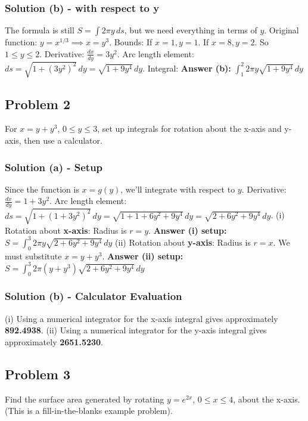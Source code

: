 \documentclass{article}
\begin{document}
\subsubsection*{Solution (b) - with respect to y}
The formula is still $ S = \int 2\pi y \,ds $, but we need everything in terms of $y$.
Original function: $y = x^{1/3} \implies x = y^3$.
Bounds: If $x=1, y=1$. If $x=8, y=2$. So $1 \le y \le 2$.
Derivative: $ \frac{dx}{dy} = 3y^2 $.
Arc length element: $ ds = \sqrt{1 + (3y^2)^2} \,dy = \sqrt{1 + 9y^4} \,dy $.
Integral:
\textbf{Answer (b):} $ \int_{1}^{2} 2\pi y \sqrt{1 + 9y^4} \,dy $

\subsection{Problem 2}
For $x = y + y^3$, $0 \le y \le 3$, set up integrals for rotation about the x-axis and y-axis, then use a calculator.
\subsubsection*{Solution (a) - Setup}
Since the function is $x=g(y)$, we'll integrate with respect to $y$.
Derivative: $ \frac{dx}{dy} = 1 + 3y^2 $.
Arc length element: $ ds = \sqrt{1 + (1 + 3y^2)^2} \,dy = \sqrt{1 + 1 + 6y^2 + 9y^4} \,dy = \sqrt{2 + 6y^2 + 9y^4} \,dy $.
(i) Rotation about \textbf{x-axis}: Radius is $r=y$.
\textbf{Answer (i) setup:} $ S = \int_{0}^{3} 2\pi y \sqrt{2 + 6y^2 + 9y^4} \,dy $
(ii) Rotation about \textbf{y-axis}: Radius is $r=x$. We must substitute $x = y+y^3$.
\textbf{Answer (ii) setup:} $ S = \int_{0}^{3} 2\pi (y+y^3) \sqrt{2 + 6y^2 + 9y^4} \,dy $

\subsubsection*{Solution (b) - Calculator Evaluation}
(i) Using a numerical integrator for the x-axis integral gives approximately \textbf{892.4938}.
(ii) Using a numerical integrator for the y-axis integral gives approximately \textbf{2651.5230}.

\subsection{Problem 3}
Find the surface area generated by rotating $y = e^{2x}$, $0 \le x \le 4$, about the x-axis. (This is a fill-in-the-blanks example problem).
\end{document}

